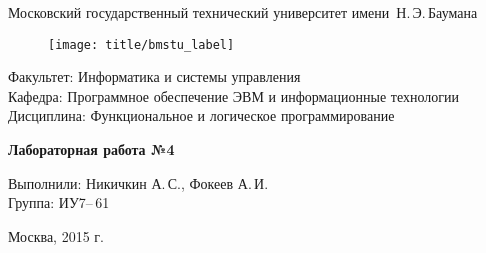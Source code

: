 
\thispagestyle{empty}

\begin{center}
	\Large
	Московский государственный технический университет имени~Н.\,Э.\,Баумана
\end{center}

\begin{figure}[h!]
	\begin{center}
		\texttt{[image: title/bmstu\_label]}
	\end{center}
\end{figure}

{\large
\noindent
Факультет: Информатика и системы управления\\[2mm]
\noindent
Кафедра: Программное обеспечение ЭВМ и информационные технологии\\[2mm]
\noindent
Дисциплина: Функциональное и логическое программирование
\vspace{1.5cm}}

\begin{center}
	\Large
	\textbf{Лабораторная работа №4}
\end{center}
\vfill

\hfill\begin{minipage}{0.5\textwidth}
	Выполнили: Никичкин А.\,С., Фокеев А.\,И.\\
	Группа: ИУ7--\,61
\end{minipage}
\vfill

\begin{center}
	Москва, 2015 г.
\end{center}